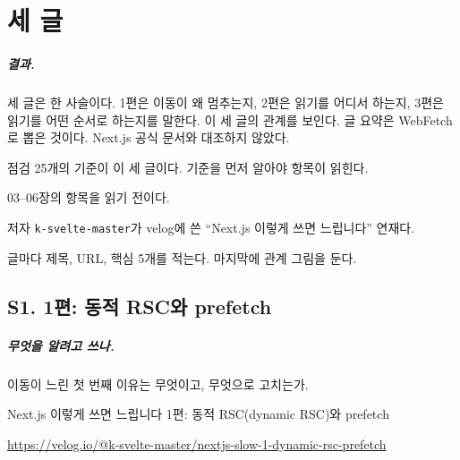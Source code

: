 \chapter{세 글}\label{ch:sources}

\paragraph{결과.}
세 글은 한 사슬이다.
1편은 이동이 왜 멈추는지, 2편은 읽기를 어디서 하는지, 3편은 읽기를 어떤 순서로 하는지를 말한다.
이 세 글의 관계를 보인다.
글 요약은 WebFetch로 뽑은 것이다. Next.js 공식 문서와 대조하지 않았다.

\begin{inbrief}
  \item[Why] 점검 25개의 기준이 이 세 글이다. 기준을 먼저 알아야 항목이 읽힌다.
  \item[When] 03--06장의 항목을 읽기 전이다.
  \item[Where] 저자 \texttt{k-svelte-master}가 velog에 쓴 ``Next.js 이렇게 쓰면 느립니다'' 연재다.
  \item[How] 글마다 제목, URL, 핵심 5개를 적는다. 마지막에 관계 그림을 둔다.
\end{inbrief}

\section{S1. 1편: 동적 RSC와 prefetch}\label{sec:src-s1}

\paragraph{무엇을 알려고 쓰나.}
이동이 느린 첫 번째 이유는 무엇이고, 무엇으로 고치는가.

\begin{description}[font=\bfseries\small, leftmargin=3.4em, labelwidth=3em, itemsep=1pt]
  \item[제목] Next.js 이렇게 쓰면 느립니다 1편: 동적 RSC(dynamic RSC)와 prefetch
  \item[URL] {\footnotesize\url{https://velog.io/@k-svelte-master/nextjs-slow-1-dynamic-rsc-prefetch}}
\end{description}

